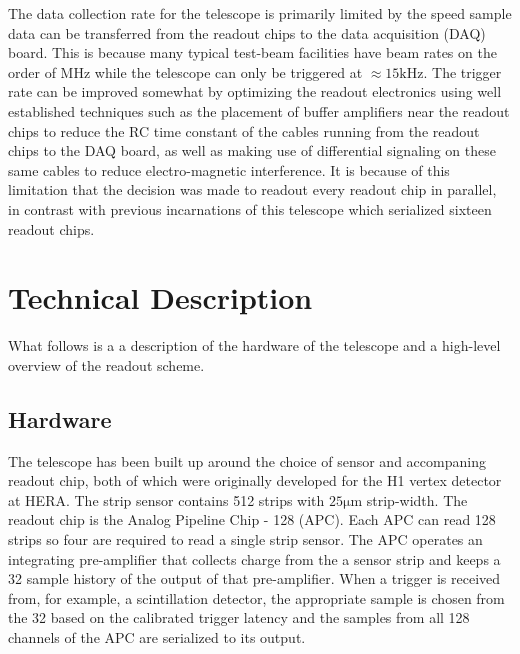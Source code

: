\documentclass{PoS}
\newcommand{\micron}{\si{\micro\meter}}
\begin{document}
The data collection rate for the telescope is primarily limited by the speed
sample data can be transferred from the readout chips to the data acquisition
(DAQ) board. This is because many typical test-beam facilities have beam rates
on the order of \si{\mega\hertz} while the telescope can only be triggered at
$\approx15\si{\kilo\hertz}$. The trigger rate can be improved somewhat by
optimizing the readout electronics using well established techniques such as
the placement of buffer amplifiers near the readout chips to reduce the RC time
constant of the cables running from the readout chips to the DAQ board, as well
as making use of differential signaling on these same cables to reduce
electro-magnetic interference. It is because of this limitation that the
decision was made to readout every readout chip in parallel, in contrast with
previous incarnations of this telescope which serialized sixteen readout chips.

\section{Technical Description}
What follows is a a description of the hardware of the telescope and a
high-level overview of the readout scheme.
\subsection{Hardware}
The telescope has been built up around the choice of sensor and accompaning
readout chip, both of which were originally developed for the H1 vertex
detector at HERA\cite{Hilgers2001}. The strip sensor contains 512 strips with
$25\micron$ strip-width. The readout chip is the Analog Pipeline Chip \-- 128
(APC). Each APC can read 128 strips so four are required to read a single strip
sensor. The APC operates an integrating pre-amplifier that collects charge from
the a sensor strip and keeps a 32 sample history of the output of that
pre-amplifier. When a trigger is received from, for example, a scintillation
detector, the appropriate sample is chosen from the 32 based on the calibrated
trigger latency and the samples from all 128 channels of the APC are serialized
to its output.
\end{document}
